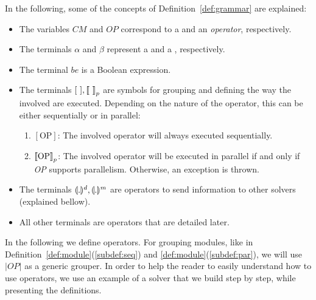 In the following, some of the concepts of Definition~\ref{def:grammar} are explained:
\begin{itemize}
	\item The variables $CM$ and $OP$ correspond to a \cm{} and an {\it operator}, respectively.
	\item The terminals $\alpha$ and $\beta$ represent a \om{} and a \opch{}, respectively.
	\item The terminal $be$ is a Boolean expression.
	\item The terminals $[\text{ } ], \left\llbracket\text{ }\right\rrbracket_p$ are symbols for grouping and defining the way the involved \cms{} are executed. Depending on the nature of the operator, this can be either sequentially or in parallel:
	\begin{enumerate}\renewcommand{\labelitemi}{\scriptsize$\blacksquare$}
		\item $\left[\text{OP}\right]$: The involved operator will always executed sequentially.
		\item $\left\llbracket\text{OP}\right\rrbracket_p$: The involved operator will be executed in parallel if and only if \emph{OP} supports parallelism. Otherwise, an exception is thrown.
	\end{enumerate}
	\item The terminals $\llparenthesis.\rrparenthesis^d, \llparenthesis.\rrparenthesis^m$ are operators to send information to other solvers (explained bellow).
	\item All other terminals are \posl{} operators that are detailed later.
\end{itemize}

In the following we define \posl{} operators. For grouping modules, like in Definition~\ref{def:module}(\ref{subdef:seq}) and \ref{def:module}(\ref{subdef:par}), we will use $\left|OP\right|$ as a generic grouper. In order to help the reader to easily understand how to use operators, we use an example of a solver that we build step by step, while presenting the definitions.

